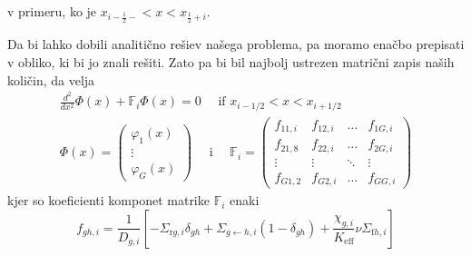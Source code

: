 \documentclass[slovene,11pt,a4paper]{article}
\def\phi{\varphi}
\begin{document}
v primeru, ko je $x_{i-\frac{1}{2}-}<x<x_{\frac{1}{2}+i}$.


Da bi lahko dobili analitično rešiev našega problema, pa moramo enačbo prepisati v obliko, ki bi jo znali rešiti. Zato pa bi bil najbolj ustrezen matrični zapis naših količin, da velja 
\begin{equation}
\begin{gathered}
\frac{d^{2}}{d x^{2}} \Phi(x)+\mathbb{F}_{i} \Phi(x)=0 \quad \text { if } x_{i-1 / 2}<x<x_{i+1 / 2} \\
\Phi(x)=\left(\begin{array}{c}
\phi_{1}(x) \\
\vdots \\
\phi_{G}(x)
\end{array}\right) \quad \text { i } \quad \mathbb{F}_{i}=\left(\begin{array}{cccc}
f_{11, i} & f_{12, i} & \ldots & f_{1 G, i} \\
f_{21,8} & f_{22, i} & \ldots & f_{2 G, i} \\
\vdots & \vdots & \ddots & \vdots \\
f_{G 1,2} & f_{G 2, i} & \ldots & f_{G G, i}
\end{array}\right)
\end{gathered}
\end{equation}
kjer so koeficienti komponet matrike $\mathbb{F}_{i}$ enaki 
\begin{equation}
f_{g h, i}=\frac{1}{D_{g, i}}\left[-\Sigma_{\mathrm{r} g, i} \delta_{g h}+\Sigma_{g \leftarrow h, i}\left(1-\delta_{g h}\right)+\frac{\chi_{g, i}}{K_{\mathrm{eff}}} \nu \Sigma_{\mathrm{f} h, i}\right]
\end{equation}
\end{document}
